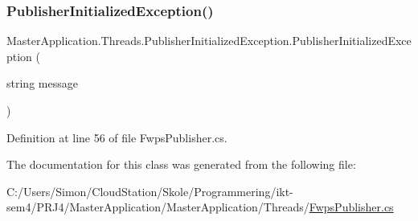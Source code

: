 \subsubsection{\texorpdfstring{Publisher\+Initialized\+Exception()}{PublisherInitializedException()}}
{\footnotesize\ttfamily Master\+Application.\+Threads.\+Publisher\+Initialized\+Exception.\+Publisher\+Initialized\+Exception (\begin{DoxyParamCaption}\item[{string}]{message }\end{DoxyParamCaption})}



Definition at line 56 of file Fwps\+Publisher.\+cs.



The documentation for this class was generated from the following file\+:\begin{DoxyCompactItemize}
\item 
C\+:/\+Users/\+Simon/\+Cloud\+Station/\+Skole/\+Programmering/ikt-\/sem4/\+P\+R\+J4/\+Master\+Application/\+Master\+Application/\+Threads/\mbox{\hyperlink{_fwps_publisher_8cs}{Fwps\+Publisher.\+cs}}\end{DoxyCompactItemize}
